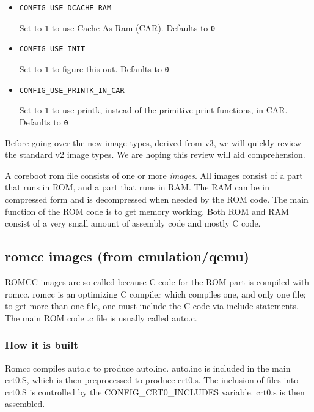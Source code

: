 \documentclass[titlepage,12pt]{article}
\begin{document}
\begin{itemize}
\item \begin{verbatim}CONFIG_USE_DCACHE_RAM\end{verbatim}

Set to \texttt{1} to use Cache As Ram (CAR). Defaults to \texttt{0}

\item \begin{verbatim}CONFIG_USE_INIT\end{verbatim}

Set to \texttt{1} to figure this out. Defaults to \texttt{0}

\item \begin{verbatim}CONFIG_USE_PRINTK_IN_CAR\end{verbatim}

Set to \texttt{1} to use printk, instead of the primitive print functions, in CAR. Defaults to \texttt{0}

\end{itemize}

Before going over the new image types, derived from v3, we will quickly review the standard v2 image types. We are hoping this review will
aid comprehension. 

A coreboot rom file consists of one or more \textit{images}. All images consist of a part that runs in ROM, and a part that runs in RAM. The RAM can be in  compressed form and is decompressed when needed by the ROM code. The main function of the ROM code is to get memory working. Both ROM and RAM consist of a very small amount of assembly code and mostly C code. 

\subsection{romcc images (from emulation/qemu)}
ROMCC images are so-called because C code for the ROM part is compiled with romcc. romcc is an optimizing C compiler which compiles one, and only 
one file; to get more than one file, one must include the C code via include statements. The main ROM code .c file is usually called auto.c. 
\subsubsection{How it is built}
Romcc compiles auto.c to produce auto.inc. auto.inc is included in the main crt0.S, which is then preprocessed to produce crt0.s. The inclusion of files into crt0.S is controlled by the CONFIG_CRT0\_INCLUDES variable. crt0.s is then assembled. 
\end{document}
